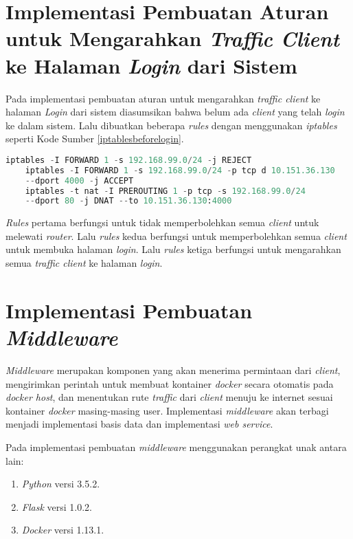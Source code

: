   \section{Implementasi Pembuatan Aturan untuk Mengarahkan \textit{Traffic Client} ke Halaman \textit{Login} dari Sistem}
  Pada implementasi pembuatan aturan untuk mengarahkan \textit{traffic client} ke halaman \textit{Login} dari sistem diasumsikan bahwa belum ada \textit{client} yang telah \textit{login} ke dalam sistem. Lalu dibuatkan beberapa \textit{rules} dengan menggunakan \textit{iptables} seperti Kode Sumber \ref{iptablesbeforelogin}. \\
  \begin{minipage}{\linewidth}
  	\begin{lstlisting}[caption=Command untuk mengarahkan \textit{client} ke halaman \textit{login},language=Python,label=iptablesbeforelogin]
  	iptables -I FORWARD 1 -s 192.168.99.0/24 -j REJECT
  	iptables -I FORWARD 1 -s 192.168.99.0/24 -p tcp d 10.151.36.130
  	--dport 4000 -j ACCEPT
  	iptables -t nat -I PREROUTING 1 -p tcp -s 192.168.99.0/24
  	--dport 80 -j DNAT --to 10.151.36.130:4000
  	\end{lstlisting}
  \end{minipage}
  
  \textit{Rules} pertama berfungsi untuk tidak memperbolehkan semua \textit{client} untuk melewati \textit{router}. Lalu \textit{rules} kedua berfungsi untuk memperbolehkan semua \textit{client} untuk membuka halaman \textit{login}. Lalu \textit{rules} ketiga berfungsi untuk mengarahkan semua \textit{traffic client} ke halaman \textit{login}.
	
  \section{Implementasi Pembuatan \textit{Middleware}}
  \textit{Middleware} merupakan komponen yang akan menerima permintaan dari \textit{client}, mengirimkan perintah untuk membuat kontainer \textit{docker} secara otomatis pada \textit{docker host}, dan menentukan rute \textit{traffic} dari \textit{client} menuju ke internet sesuai kontainer \textit{docker} masing-masing user. Implementasi \textit{middleware} akan terbagi menjadi implementasi basis data dan implementasi \textit{web service}.
  
  Pada implementasi pembuatan \textit{middleware} menggunakan perangkat unak antara lain:
  \begin{enumerate}
	\item \textit{Python} versi 3.5.2.
	\item \textit{Flask} versi 1.0.2.
	\item \textit{Docker} versi 1.13.1.
  \end{enumerate}
  
